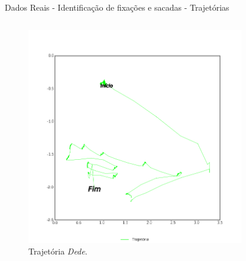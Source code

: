 \documentclass[10pt]{beamer}
\begin{document}
\begin{frame}{Dados Reais - Identificação de fixações e sacadas -  Trajetórias}
    \begin{columns}
        \begin{column}{0.48\textwidth}
            \begin{figure}[H]
                \begin{center}
                    \includegraphics[scale=0.25]{imagens/trajetoria_dede.png}
                    \caption{Trajetória \textit{Dede}.}
                \end{center}
            \end{figure}
        \end{column}
        \begin{column}{0.48\textwidth}
            \begin{figure}[H]
                \begin{center}

\end{center}
\end{figure}
\end{column}
\end{columns}
\end{frame}
\end{document}
